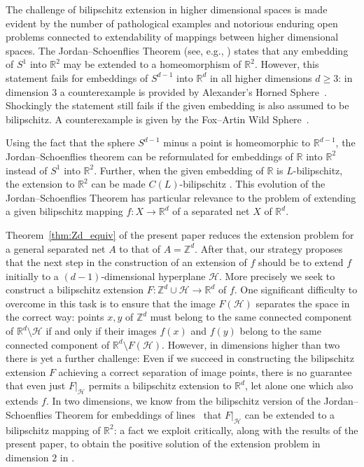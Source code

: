 \documentclass[a4paper, bibliography=totoc]{scrartcl}
\numberwithin{claimcounter}{define}
\newcommand{\R}{\mathbb{R}}
\newcommand{\Z}{\mathbb{Z}}
\newcommand{\mc}[1]{\mathcal{#1}}
\begin{document}
The challenge of bilipschitz extension in higher dimensional spaces is made evident by the number of pathological examples and notorious enduring open problems connected to extendability of mappings between higher dimensional spaces. The Jordan--Schoenflies Theorem (see, e.g., \cite[Thm.~3.1]{Thomassen-JordanSchoenflies}) states that any embedding of $S^1$ into $\R^2$ may be extended to a homeomorphism of $\R^{2}$. However, this statement fails for embeddings of $S^{d-1}$ into $\R^{d}$ in all higher dimensions $d\geq 3$: in dimension 3 a counterexample is provided by Alexander's Horned Sphere~\cite{alexander_horned_sphere}. Shockingly the statement still fails if the given embedding is also assumed to be bilipschitz. A counterexample is given by the Fox--Artin Wild Sphere~\cite[Theorem~3.7]{Martin_wild_ball}. 

Using the fact that the sphere $S^{d-1}$ minus a point is homeomorphic to $\R^{d-1}$, the Jordan--Schoenflies theorem can be reformulated for embeddings of $\R$ into $\R^{2}$ instead of $S^{1}$ into $\R^{2}$. Further, when the given embedding of $\R$ is $L$-bilipschitz, the extension to $\R^{2}$ can be made $C(L)$-bilipschitz \cite{Tukia_planar_Schoenflies, Kovalev_bilip_ext_from_line}. This evolution of the Jordan--Schoenflies Theorem has particular relevance to the problem of extending a given bilipschitz mapping $f\colon X\to\R^{d}$ of a separated net $X$ of $\R^{d}$.

Theorem~\ref{thm:Zd_equiv} of the present paper reduces the extension problem for a general separated net $A$ to that of $A=\Z^d$. After that, our strategy proposes that the next step in the construction of an extension of $f$ should be to extend $f$ initially to a $(d-1)$-dimensional hyperplane $\mc{H}$. More precisely we seek to construct a bilipschitz extension $F\colon \Z^d\cup \mc{H}\to\R^{d}$ of $f$.
One significant difficulty to overcome in this task is to ensure that the image $F(\mc{H})$ separates the space in the correct way: points $x,y$ of $\Z^d$ must belong to the same connected component of $\R^{d}\setminus \mc{H}$ if and only if their images $f(x)$ and $f(y)$ belong to the same connected component of $\R^{d}\setminus F(\mc{H})$.
However, in dimensions higher than two there is yet a further challenge: Even if we succeed in constructing the bilipschitz extension $F$ achieving a correct separation of image points, there is no guarantee that even just $F|_{\mc{H}}$ permits a bilipschitz extension to $\R^{d}$, let alone one which also extends $f$.
In two dimensions, we know from the bilipschitz version of the Jordan--Schoenflies Theorem for embeddings of lines~\cite{Tukia_planar_Schoenflies, Kovalev_bilip_ext_from_line} that $F|_{\mc{H}}$ can be extended to a bilipschitz mapping of $\R^{2}$: a fact we exploit critically, along with the results of the present paper, to obtain the positive solution of the extension problem in dimension $2$ in \cite{DK_2dim}.  
\end{document}
